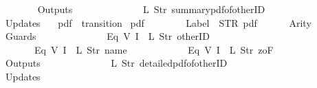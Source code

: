 \begin{isabellebody}
\ \ \ \ \ \ {\isacharbrackright}{\isacharcomma}\isanewline
\ \ \ \ \ \ Outputs\ {\isacharequal}\ {\isacharbrackleft}\isanewline
\ \ \ \ \ \ \ \ \ \ \ \ {\isacharparenleft}L\ {\isacharparenleft}Str\ {\isacharprime}{\isacharprime}summary{\isacharunderscore}pdf{\isacharunderscore}of{\isacharunderscore}otherID{\isacharprime}{\isacharprime}{\isacharparenright}{\isacharparenright}\isanewline
\ \ \ \ \ \ {\isacharbrackright}{\isacharcomma}\isanewline
\ \ \ \ \ \ Updates\ {\isacharequal}\ {\isacharbrackleft}{\isacharbrackright}\isanewline
{\isasymrparr}{\isachardoublequoteclose}\isanewline
\isanewline
{}\isamarkupfalse%
\ {\isachardoublequoteopen}pdf{}{\isachardoublequoteclose}\ {\isacharcolon}{\isacharcolon}\ {\isachardoublequoteopen}transition{\isachardoublequoteclose}\ \isanewline
{\isachardoublequoteopen}pdf{}\ {\isasymequiv}\ {\isasymlparr}\isanewline
\ \ \ \ \ \ Label\ {\isacharequal}\ STR\ {\isacharprime}{\isacharprime}pdf{\isacharprime}{\isacharprime}{\isacharcomma}\isanewline
\ \ \ \ \ \ Arity\ {\isacharequal}\ {}{\isacharcomma}\isanewline
\ \ \ \ \ \ Guards\ {\isacharequal}\ {\isacharbrackleft}\isanewline
\ \ \ \ \ \ \ \ \ \ \ \ Eq\ {\isacharparenleft}V\ {\isacharparenleft}I\ {}{\isacharparenright}{\isacharparenright}\ {\isacharparenleft}L\ {\isacharparenleft}Str\ {\isacharprime}{\isacharprime}otherID{\isacharprime}{\isacharprime}{\isacharparenright}{\isacharparenright}{\isacharcomma}\isanewline
\ \ \ \ \ \ \ \ \ \ \ \ Eq\ {\isacharparenleft}V\ {\isacharparenleft}I\ {}{\isacharparenright}{\isacharparenright}\ {\isacharparenleft}L\ {\isacharparenleft}Str\ {\isacharprime}{\isacharprime}name{\isacharprime}{\isacharprime}{\isacharparenright}{\isacharparenright}{\isacharcomma}\isanewline
\ \ \ \ \ \ \ \ \ \ \ \ Eq\ {\isacharparenleft}V\ {\isacharparenleft}I\ {}{\isacharparenright}{\isacharparenright}\ {\isacharparenleft}L\ {\isacharparenleft}Str\ {\isacharprime}{\isacharprime}{}zoF{\isacharprime}{\isacharprime}{\isacharparenright}{\isacharparenright}\isanewline
\ \ \ \ \ \ {\isacharbrackright}{\isacharcomma}\isanewline
\ \ \ \ \ \ Outputs\ {\isacharequal}\ {\isacharbrackleft}\isanewline
\ \ \ \ \ \ \ \ \ \ \ \ {\isacharparenleft}L\ {\isacharparenleft}Str\ {\isacharprime}{\isacharprime}detailed{\isacharunderscore}pdf{\isacharunderscore}of{\isacharunderscore}otherID{\isacharprime}{\isacharprime}{\isacharparenright}{\isacharparenright}\isanewline
\ \ \ \ \ \ {\isacharbrackright}{\isacharcomma}\isanewline
\ \ \ \ \ \ Updates\ {\isacharequal}\ {\isacharbrackleft}{\isacharbrackright}\isanewline

\end{isabellebody}
